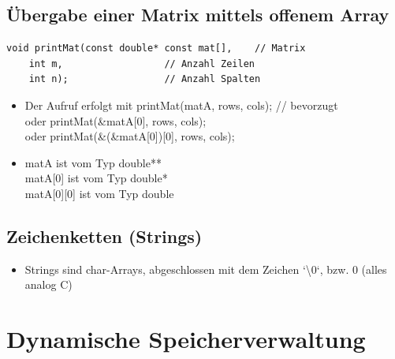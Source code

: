 \subsection{Übergabe einer Matrix mittels offenem Array}
\label{sec:Uebergabe einer Matrix mittels offenem Array}
\noindent
\begin{minipage}{\linewidth}
\begin{lstlisting}
void printMat(const double* const mat[],	// Matrix
	int m,					// Anzahl Zeilen
	int n);					// Anzahl Spalten
\end{lstlisting}
\end{minipage}
\begin{itemize}
	\item Der Aufruf erfolgt mit \hspace{5mm}printMat(matA, rows, cols); // bevorzugt\\
		oder	\hspace{3.4cm} printMat(\&matA[0], rows, cols);\\
		oder \hspace{3.4cm} printMat(\&(\&matA[0])[0], rows, cols);
	\item matA \hspace{1cm} ist vom Typ double**\\
		matA[0] \hspace{6mm} ist vom Typ double*\\
		matA[0][0] \hspace{2mm} ist vom Typ double
\end{itemize}

\subsection{Zeichenketten (Strings)}
\label{sec:Zeichenketten (Strings)}
\begin{itemize}
	\item Strings sind char-Arrays, abgeschlossen mit dem Zeichen `\textbackslash0`, bzw. 0 (alles analog C)
\end{itemize}

\section{Dynamische Speicherverwaltung}
\label{sec:Dynamische Speicherverwaltung}

